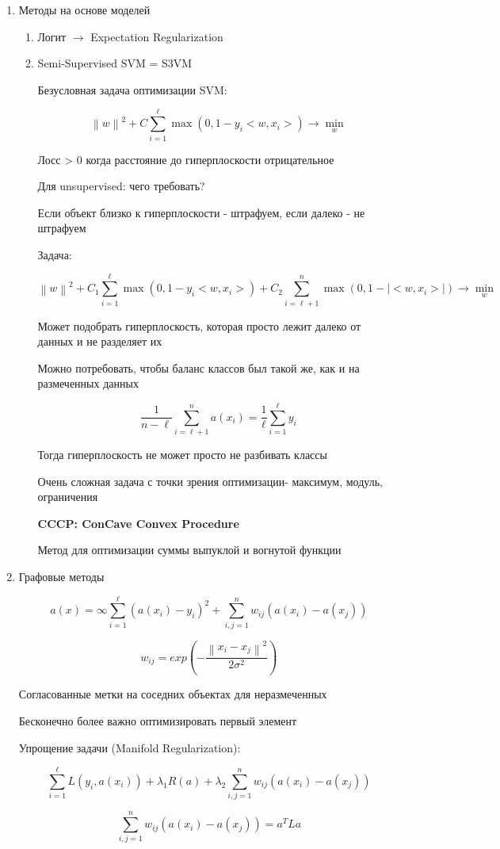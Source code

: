 \documentclass[a4paper, 12pt]{article}
\newcommand\norm[1]{\left\lVert#1\right\rVert}
\begin{document}
\begin{enumerate}
    \item Методы на основе моделей
    
    \begin{enumerate}
        \item Логит $\rightarrow$ Expectation Regularization
        \item Semi-Supervised SVM = S3VM
        
        Безусловная задача оптимизации SVM:

        \[\norm{w}^2 + C\sum_{i = 1}^{\ell}\max(0, 1 - y_i<w, x_i>) 
        \rightarrow \min_{w}\]

        Лосс > 0 когда расстояние до гиперплоскости отрицательное

        Для unsupervised: чего требовать?

        Если объект близко к гиперплоскости - штрафуем, 
        если далеко - не штрафуем
        
        Задача:

        \[\norm{w}^2 + C_1 \sum_{i = 1}^{\ell} \max(0, 1 - y_i<w, x_i>)
        + C_2 \sum_{i = \ell + 1}^n \max(0, 1 - \mid<w, x_i>\mid)
        \rightarrow \min_{w}\]

        Может подобрать гиперплоскость, которая просто лежит
        далеко от данных и не разделяет их

        Можно потребовать, чтобы баланс классов был такой же,
        как и на размеченных данных

        \[\frac{1}{n - \ell} \sum_{i = \ell + 1}^n a(x_i)
        = \frac{1}{\ell} \sum_{i = 1}^{\ell} y_i\]

        Тогда гиперплоскость не может просто не разбивать классы

        Очень сложная задача с точки зрения оптимизации- 
        максимум, модуль, ограничения

        \textbf{CCCP: ConCave Convex Procedure}
        
        Метод для оптимизации суммы выпуклой и вогнутой функции
    \end{enumerate}
    \item Графовые методы
    
    \[a(x) = \infty \sum_{i = 1}^{\ell} (a(x_i) - y_i)^2 +
    \sum_{i, j = 1}^n w_{ij}(a(x_i) - a(x_j))\]

    \[w_{ij} = exp \left(- \frac{\norm{x_i - x_j}^2}
    {2\sigma^2}\right)\]

    Согласованные метки на соседних объектах для неразмеченных

    Бесконечно более важно оптимизировать первый элемент

    Упрощение задачи (Manifold Regularization):

    \[\sum_{i = 1}^{\ell} L(y_i, a(x_i)) +
    \lambda_1 R(a) + 
    \lambda_2 \sum_{i, j = 1}^n w_{ij}(a(x_i) - a(x_j))\]

    \[\sum_{i, j = 1}^n w_{ij}(a(x_i) - a(x_j)) = a^T L a\]
\end{enumerate} 
\pagebreak
\end{document}
